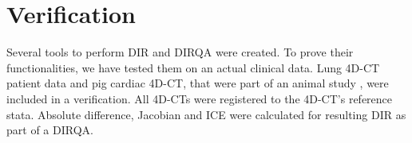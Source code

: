 % 
% 
% 
% 
% 


\newpage
\section{Verification}
\label{Verification}

Several tools to perform DIR and DIRQA were created. 
To prove their functionalities, we have tested them on an actual clinical data. Lung 4D-CT patient data and pig cardiac 4D-CT, that were part of an animal study \cite{Lehmann2015},
were included in a verification. All 4D-CTs were registered to the 4D-CT's reference stata. Absolute difference, Jacobian and ICE were calculated for resulting 
DIR as part of a DIRQA.

